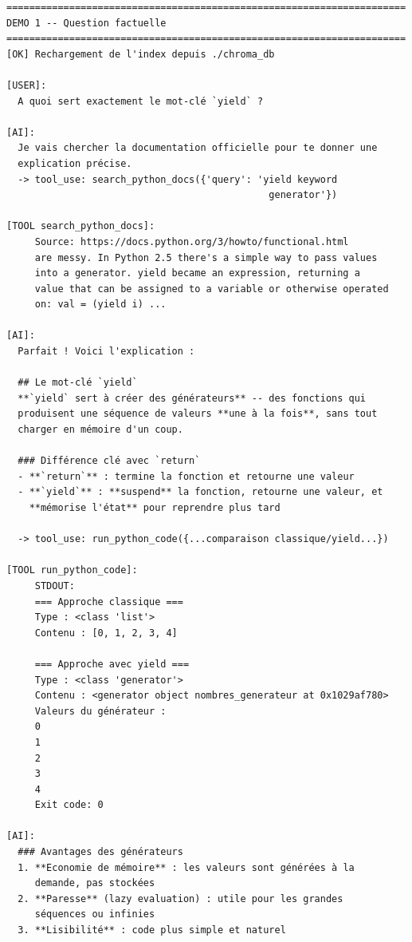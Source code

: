 \documentclass[11pt,a4paper]{article}
\begin{document}
\begin{tcolorbox}[
  colback=white,
  colframe=black!50,
  coltitle=black,
  fonttitle=\footnotesize\bfseries,
  fontupper=\footnotesize,
  title=Sortie de l'exécution,
  breakable,
]
\begin{verbatim}
======================================================================
DEMO 1 -- Question factuelle
======================================================================
[OK] Rechargement de l'index depuis ./chroma_db

[USER]:
  A quoi sert exactement le mot-clé `yield` ?

[AI]:
  Je vais chercher la documentation officielle pour te donner une
  explication précise.
  -> tool_use: search_python_docs({'query': 'yield keyword
                                              generator'})

[TOOL search_python_docs]:
     Source: https://docs.python.org/3/howto/functional.html
     are messy. In Python 2.5 there's a simple way to pass values
     into a generator. yield became an expression, returning a
     value that can be assigned to a variable or otherwise operated
     on: val = (yield i) ...

[AI]:
  Parfait ! Voici l'explication :

  ## Le mot-clé `yield`
  **`yield` sert à créer des générateurs** -- des fonctions qui
  produisent une séquence de valeurs **une à la fois**, sans tout
  charger en mémoire d'un coup.

  ### Différence clé avec `return`
  - **`return`** : termine la fonction et retourne une valeur
  - **`yield`** : **suspend** la fonction, retourne une valeur, et
    **mémorise l'état** pour reprendre plus tard

  -> tool_use: run_python_code({...comparaison classique/yield...})

[TOOL run_python_code]:
     STDOUT:
     === Approche classique ===
     Type : <class 'list'>
     Contenu : [0, 1, 2, 3, 4]

     === Approche avec yield ===
     Type : <class 'generator'>
     Contenu : <generator object nombres_generateur at 0x1029af780>
     Valeurs du générateur :
     0
     1
     2
     3
     4
     Exit code: 0

[AI]:
  ### Avantages des générateurs
  1. **Economie de mémoire** : les valeurs sont générées à la
     demande, pas stockées
  2. **Paresse** (lazy evaluation) : utile pour les grandes
     séquences ou infinies
  3. **Lisibilité** : code plus simple et naturel


\end{verbatim}
\end{tcolorbox}
\end{document}
